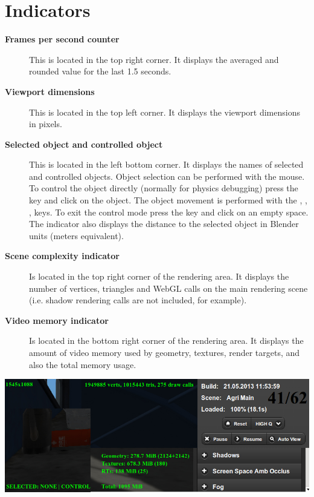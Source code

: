 \documentclass[a4paper,12pt,oneside]{sphinxmanual}
\begin{document}
\section{Indicators}
\label{viewer:id5}\begin{description}
\item[{\textbf{Frames per second counter}}] \leavevmode
This is located in the top right corner. It displays the averaged and rounded value for the last 1.5 seconds.

\item[{\textbf{Viewport dimensions}}] \leavevmode
This is located in the top left corner. It displays the viewport dimensions in pixels.

\item[{\textbf{Selected object and controlled object}}] \leavevmode
This is located in the left bottom corner. It displays the names of selected and controlled objects. Object selection can be performed with the mouse. To control the object directly (normally for physics debugging) press the  key and click on the object. The object movement is performed with the , , ,  keys. To exit the control mode press the  key and click on an empty space. The indicator also displays the distance to the selected object in Blender units (meters equivalent).

\item[{\textbf{Scene complexity indicator}}] \leavevmode
Is located in the top right corner of the rendering area. It displays the number of vertices, triangles and WebGL calls on the main rendering scene (i.e. shadow rendering calls are not included, for example).

\item[{\textbf{Video memory indicator}}] \leavevmode
Is located in the bottom right corner of the rendering area. It displays the amount of video memory used by geometry, textures, render targets, and also the total memory usage.

\end{description}

{\hfill\includegraphics[width=1.000\linewidth]{indicators.jpg}\hfill}
\end{document}
